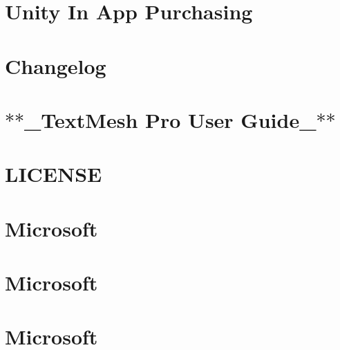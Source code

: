 \let\mypdfximage\pdfximage\def\pdfximage{\immediate\mypdfximage}\documentclass[twoside]{book}
\newcommand{\+}{\discretionary{\mbox{\scriptsize$\hookleftarrow$}}{}{}}
\begin{document}
\chapter{Unity In App Purchasing}
\label{autotoc_md152}

\chapter{Changelog}
\label{autotoc_md154}

\chapter{$\ast$$\ast$\+\_\+\+Text\+Mesh Pro User Guide\+\_\+$\ast$$\ast$}
\label{autotoc_md177}

\chapter{L\+I\+C\+E\+N\+SE}
\label{md_Library_PackageCache_com_8unity_8textmeshpro_0d1_83_80_LICENSE}

\chapter{Microsoft}
\label{md_Packages_Microsoft_8CodeAnalysis_8VersionCheckAnalyzer_82_89_84_documentation_Microsoft_8CodeAnalysis_8VersionCheckAnalyzer}

\chapter{Microsoft}
\label{md_Packages_Microsoft_8CodeQuality_8Analyzers_82_89_84_documentation_Microsoft_8CodeQuality_8Analyzers}

\chapter{Microsoft}
\label{md_Packages_Microsoft_8NetCore_8Analyzers_82_89_84_documentation_Microsoft_8NetCore_8Analyzers}

\end{document}
